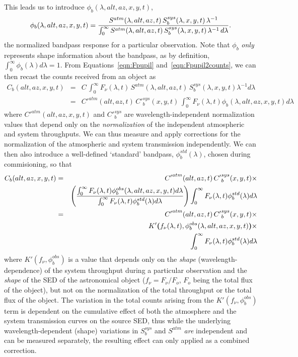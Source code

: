 \documentclass[12pt,preprint]{aastex}
\begin{document}
This leads us to introduce $\phi_b(\lambda,alt,az,x,y,t)$,
\begin{equation}
\label{eqn:PhiDef}
   \phi_b(\lambda,alt,az,x,y,t) =  {
     {S^{atm}(\lambda,alt,az,t)\, S_b^{sys}(\lambda,x,y,t) \,
       \lambda^{-1}} \over
     \int_0^\infty { {S^{atm}(\lambda,alt,az,t) \,
         S_b^{sys}(\lambda,x,y,t) \, \lambda^{-1}} \,d\lambda}}.
\end{equation}
the normalized bandpass response for a particular observation. Note
that $\phi_b$ {\it only} represents shape information about the
bandpass, as by definition, $\int_0^\infty {\phi_b(\lambda) d\lambda}=1$. 
From Equations~\ref{eqn:Fpupil} and~\ref{eqn:Fpupil2counts}, we can then 
recast the counts received from an object as
\begin{eqnarray}
\label{eqn:fullcounts}
C_b(alt,az,x,y,t) & = & C \, \int_0^\infty {F_\nu(\lambda,t) \,
  S^{atm}(\lambda,alt,az,t) \, S_b^{sys}(\lambda,x,y,t)
  \lambda^{-1} d\lambda} \nonumber \\
&= & {C'}^{atm}(alt,az,t) \, {C'}_b^{sys}(x,y,t) \,
     \int_0^\infty {F_\nu(\lambda,t)\phi_b(\lambda,alt,az,x,y,t)
       d\lambda} 
\end{eqnarray}
where ${C'}^{atm}(alt,az,x,y,t)$ and ${C'}_b^{sys}$ are
wavelength-independent normalization values that depend only on the
{\it normalization} of the independent atmospheric and system
throughputs. We can thus measure and apply corrections for the
normalization of the atmospheric and system transmission
independently.  We can then also introduce a well-defined `standard'
bandpass, $\phi_b^{std}(\lambda)$, chosen during commisioning, so that
\begin{eqnarray}
\label{eqn:counts}
C_b(alt,az,x,y,t) & = & {C'}^{atm}(alt,az,t)\,{C'}_b^{sys}(x,y,t) \times
\nonumber \\
&& \left( {\int_0^\infty {F_\nu(\lambda,t)\phi_b^{obs}(\lambda,alt,az,x,y,t) d\lambda} \over 
\int_0^\infty {F_\nu(\lambda,t)\phi_b^{std}(\lambda) d\lambda}} 
\right) \int_0^\infty {F_\nu(\lambda,t)\phi_b^{std}(\lambda)  d\lambda}
\nonumber \\ 
& = & {C'}^{atm}(alt,az,t)\, {C'}_b^{sys}(x,y,t) \times \nonumber \\
&&  K'{\textbf(}f_\nu(\lambda,t),
\phi_b^{obs}(\lambda,alt,az,x,y,t){\textbf)} \times \nonumber \\
&& \int_0^\infty {F_\nu(\lambda,t)\phi_b^{std}(\lambda)  d\lambda}
\end{eqnarray}
where $K'(f_\nu, \phi_b^{obs})$ is a value that
depends only on the {\it shape} (wavelength-dependence) of the system
throughput during a particular observation and the {\it shape} of the SED
of the astronomical object ($f_\nu = F_\nu / F_o$, $F_o$ being the
total flux of the object),
but not on the normalization of the total throughput or the total flux
of the object.  The variation in
the total counts arising from the $K'(f_\nu,
\phi_b^{obs})$ term is dependent on the cumulative effect of both the
atmosphere and the system transmission curves on the source SED, thus
while the underlying wavelength-dependent (shape) variations in $S_b^{sys}$
and $S^{atm}$ {\it are} independent and can be measured separately,
the resulting effect can only applied as a combined correction. 
\end{document}
